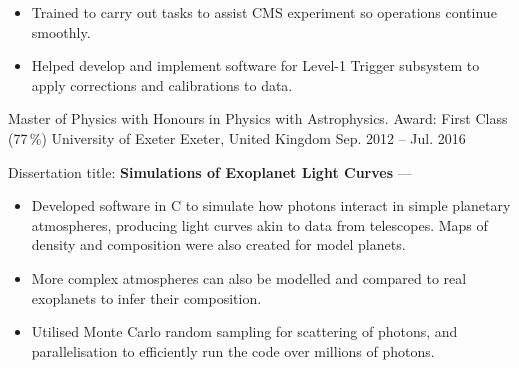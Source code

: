\begin{cventries}
{\begin{cvitems}
            \vpaddingEduSubpoint
            \begin{itemize}
                \item[\bullet]{Trained to carry out tasks to assist CMS experiment so operations continue smoothly.}
                \vpaddingEduSubpoint
                \item[\bullet]{Helped develop and implement software for Level-1 Trigger subsystem to apply corrections and calibrations to data.}
            \end{itemize}
        \end{cvitems}
        }

    \cventry
        {Master of Physics with Honours in Physics with Astrophysics. Award: First Class (77\,\%)}
        {University of Exeter}
        {Exeter, United Kingdom}
        {Sep. 2012 -- Jul. 2016}
        {
        \begin{cvitems} %
            \item {Dissertation title: \textbf{Simulations of Exoplanet Light Curves} --- }
            \vpaddingEduSubpoint
            \begin{itemize}
                \item[\bullet]{Developed software in C to simulate how photons interact in simple planetary atmospheres, producing light curves akin to data from telescopes. Maps of density and composition were also created for model planets.}
                \vpaddingEduSubpoint
                \item[\bullet]{More complex atmospheres can also be modelled and compared to real exoplanets to infer their composition.}
                \vpaddingEduSubpoint
                \item[\bullet]{Utilised Monte Carlo random sampling for scattering of photons, and parallelisation to efficiently run the code over millions of photons.}
            \end{itemize}
        \end{cvitems}
        } %


\end{cventries}
